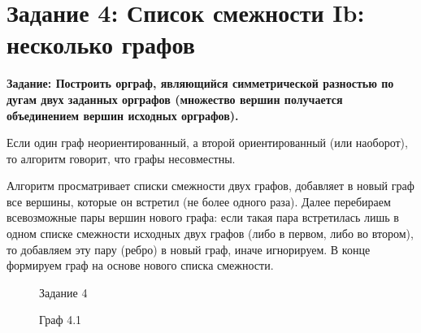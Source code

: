 \documentclass[otchet]{SCWorks}
\begin{document}
\section{Задание 4: Список смежности Ib: несколько графов}

\textbf{Задание: Построить орграф, являющийся симметрической разностью по дугам двух заданных орграфов (множество вершин получается объединением вершин исходных орграфов).}

Если один граф неориентированный, а второй ориентированный (или наоборот), то алгоритм говорит, что графы несовместны.

Алгоритм просматривает списки смежности двух графов, добавляет в новый граф все вершины, которые он встретил (не более одного раза). Далее перебираем всевозможные пары вершин нового графа: если такая пара встретилась лишь в одном списке смежности исходных двух графов (либо в первом, либо во втором), то добавляем эту пару (ребро) в новый граф, иначе игнорируем. В конце формируем граф на основе нового списка смежности.

\begin{figure}[H]
	\caption{Задание 4}
	\label{pic4_1}
\end{figure}

\begin{figure}[H]
	\caption{Граф 4.1}
	\label{gr4_1}
\end{figure}
\end{document}
